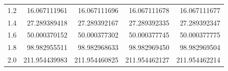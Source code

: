 \begin{examplesolution}
\begin{newtable}
\begin{center}
\begin{tabular}{|c|r|r|r|r|}
      1.2                       & 16.067111961                  & 16.067111696                  & 16.067111678                   & 16.067111677                    \\
      1.4                       & 27.289389418                  & 27.289392167                  & 27.289392335                   & 27.289392347                    \\
      1.6                       & 50.000370152                  & 50.000377302                  & 50.000377745                   & 50.000377775                    \\
      1.8                       & 98.982955511                  & 98.982968633                  & 98.982969450                   & 98.982969504                    \\
      2.0                       & 211.954439983                 & 211.954460825                 & 211.954462127                  & 211.954462214                   \\
      \hline
    \end{tabular}
  \end{center}
\end{newtable}
\end{examplesolution}

